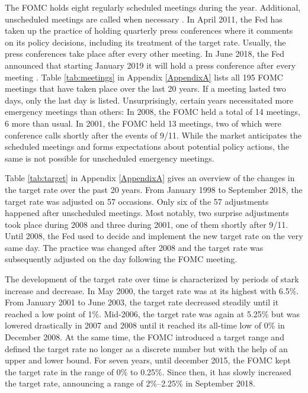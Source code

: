 \documentclass[11pt,a4paper,english,oneside]{book}
\numberwithin{equation}{chapter}
\begin{document}
The FOMC holds eight regularly scheduled meetings during the year. Additional, unscheduled meetings are called when necessary \citep{FOMC.2018}. In April 2011, the Fed has taken up the practice of holding quarterly press conferences where it comments on its policy decisions, including its treatment of the target rate. Usually, the press conferences take place after every other meeting. In June 2018, the Fed announced that starting January 2019 it will hold a press conference after every meeting \citep{PressConference.2018}. Table \ref{tab:meetings} in Appendix \ref{AppendixA} lists all 195 FOMC meetings that have taken place over the last 20 years. If a meeting lasted two days, only the last day is listed. Unsurprisingly, certain years necessitated more emergency meetings than others: In 2008, the FOMC held a total of 14 meetings, 6 more than usual. In 2001, the FOMC held 13 meetings, two of which were conference calls shortly after the events of 9/11. While the market anticipates the scheduled meetings and forms expectations about potential policy actions, the same is not possible for unscheduled emergency meetings. 

Table \ref{tab:target} in Appendix \ref{AppendixA} gives an overview of the changes in the target rate over the past 20 years. From January 1998 to September 2018, the target rate was adjusted on 57 occasions. Only six of the 57 adjustments happened after unscheduled meetings. Most notably, two surprise adjustments took place during 2008 and three during 2001, one of them shortly after 9/11. Until 2008, the Fed used to decide and implement the new target rate on the very same day. The practice was changed after 2008 and the target rate was subsequently adjusted on the day following the FOMC meeting. 

The development of the target rate over time is characterized by periods of stark increase and decrease. In May 2000, the target rate was at its highest with 6.5\%. From January 2001 to June 2003, the target rate decreased steadily until it reached a low point of 1\%. Mid-2006, the target rate was again at 5.25\% but was lowered drastically in 2007 and 2008 until it reached its all-time low of 0\% in December 2008. At the same time, the FOMC introduced a target range and defined the target rate no longer as a discrete number but with the help of an upper and lower bound. For seven years, until december 2015, the FOMC kept the target rate in the range of 0\% to 0.25\%. Since then, it has slowly increased the target rate, announcing a range of 2\%--2.25\% in September 2018.
%
\end{document}
